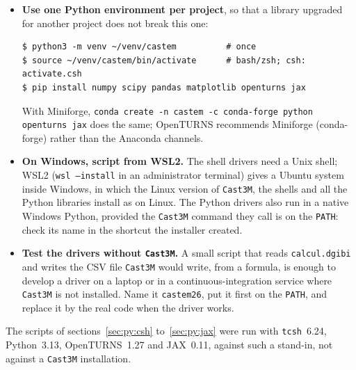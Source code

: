 \begin{itemize}
\item \textbf{Use one Python environment per project}, so that a library
  upgraded for another project does not break this one:
\begin{codebox}
\begin{verbatim}
$ python3 -m venv ~/venv/castem          # once
$ source ~/venv/castem/bin/activate      # bash/zsh; csh: activate.csh
$ pip install numpy scipy pandas matplotlib openturns jax
\end{verbatim}
\end{codebox}
  With Miniforge, \texttt{conda create -n castem -c conda-forge python
  openturns jax} does the same; OpenTURNS recommends Miniforge (conda-forge)
  rather than the Anaconda channels.
\item \textbf{On Windows, script from WSL2.} The shell drivers need a Unix
  shell; WSL2 (\texttt{wsl --install} in an administrator terminal) gives a
  Ubuntu system inside Windows, in which the Linux version of \texttt{Cast3M},
  the shells and all the Python libraries install as on Linux. The Python
  drivers also run in a native Windows Python, provided the \texttt{Cast3M}
  command they call is on the \texttt{PATH}: check its name in the shortcut
  the installer created.
\item \textbf{Test the drivers without \texttt{Cast3M}.} A small script that
  reads \texttt{calcul.dgibi} and writes the CSV file \texttt{Cast3M} would
  write, from a formula, is enough to develop a driver on a laptop or in a
  continuous-integration service where \texttt{Cast3M} is not installed.
  Name it \texttt{castem26}, put it first on the \texttt{PATH}, and replace
  it by the real code when the driver works.
\end{itemize}

\noindent The scripts of sections~\ref{sec:py:csh} to~\ref{sec:py:jax} were run
with \texttt{tcsh}~6.24, Python~3.13, OpenTURNS~1.27 and JAX~0.11, against
such a stand-in, not against a \texttt{Cast3M} installation.


